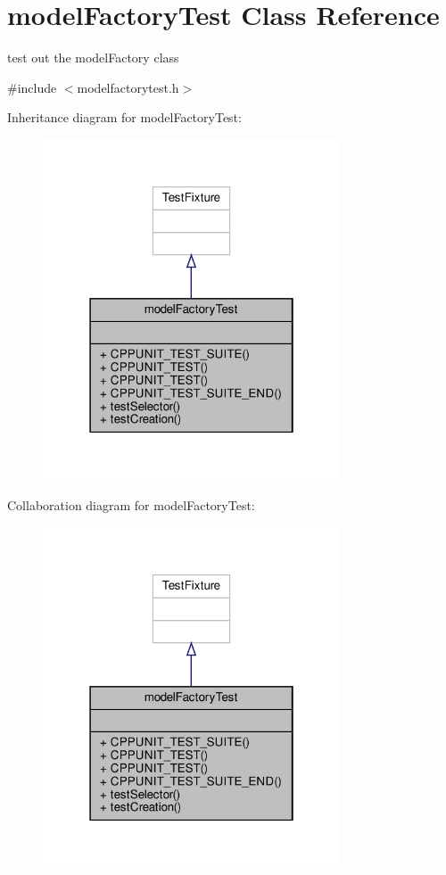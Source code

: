 \hypertarget{classmodelFactoryTest}{}\section{model\+Factory\+Test Class Reference}
\label{classmodelFactoryTest}


test out the model\+Factory class  




{\ttfamily \#include $<$modelfactorytest.\+h$>$}



Inheritance diagram for model\+Factory\+Test\+:\nopagebreak
\begin{figure}[H]
\begin{center}
\leavevmode
\includegraphics[width=250pt]{classmodelFactoryTest__inherit__graph}
\end{center}
\end{figure}


Collaboration diagram for model\+Factory\+Test\+:\nopagebreak
\begin{figure}[H]
\begin{center}
\leavevmode
\includegraphics[width=250pt]{classmodelFactoryTest__coll__graph}
\end{center}
\end{figure}

